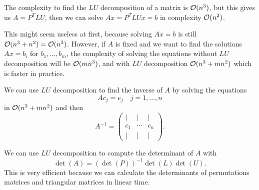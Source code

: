 \documentclass[11pt,a4paper]{article}
\begin{document}
\begin{remark}
  The complexity to find the $LU$ decomposition of a matrix is $\mathcal{O}(n^3)$,
  but this gives us $A = P^T LU$, then we can solve $Ax = P^T LU x = b$
  in complexity $\mathcal{O}(n^2)$.

  This might seem useless at first, because solving $Ax = b$ is still
  $\mathcal{O}(n^3 + n^2) = \mathcal{O}(n^3)$.
  However, if $A$ is fixed and we want to find the solutions $A x = b_i$
  for $b_1,\dots,b_m$, the complexity of solving the equations without
  $LU$ decomposition will be $\mathcal{O}(m n^3)$,
  and with $LU$ decomposition $\mathcal{O}(n^3 + m n^2)$ which is faster in practice.
\end{remark}
\begin{example}
  We can use $LU$ decomposition to find the inverse of $A$ by solving
  the equations
  \[
    A c_j = e_j \quad j = 1,\dots,n
  \]
  in $\mathcal{O}(n^3 + m n^2)$ and then
  \[
    A^{-1} =
    \begin{pmatrix}
      \vert & \vert & \vert \\
      c_1 & \cdots & c_n \\
      \vert & \vert & \vert
    \end{pmatrix}.
  \]
\end{example}
\begin{example}
  We can use $LU$ decomposition to compute the determinant of $A$ with
  \[
    \det(A) = (\det (P))^{-1} \det(L) \det(U).
  \]
  This is very efficient because we can calculate the determinants of
  permutations matrices and triangular matrices in linear time.
\end{example}
\end{document}
